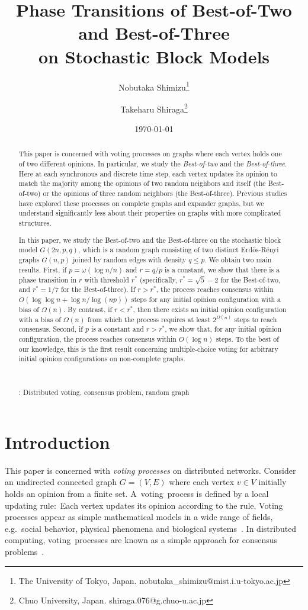 \documentclass[letterpaper,11pt]{article}
\title{Phase Transitions of Best-of-Two and Best-of-Three\\ on Stochastic Block Models}
\author{Nobutaka Shimizu\thanks{The University of Tokyo, Japan. {\ttfamily nobutaka\_shimizu@mist.i.u-tokyo.ac.jp}} \and Takeharu Shiraga\thanks{Chuo University, Japan. {\ttfamily shiraga.076@g.chuo-u.ac.jp}}}
\date{\today}
\begin{document}
\maketitle


\begin{abstract}
This paper is concerned with voting processes on graphs where each vertex holds one of two different opinions.
In particular, we study the \emph{Best-of-two} and the \emph{Best-of-three}.
Here at each synchronous and discrete time step, each vertex updates its opinion to match the majority among the opinions of two random neighbors and itself (the Best-of-two) or the  opinions of three random neighbors (the Best-of-three).
Previous studies have explored these processes on complete graphs and expander graphs, 
but we understand significantly less about their properties on graphs with more complicated structures.

In this paper, we study the Best-of-two and the Best-of-three on the stochastic block model $G(2n,p,q)$, which is a random graph consisting of two distinct Erd\H{o}s-R\'enyi graphs $G(n,p)$ joined by random edges with density $q\leq p$.
We obtain two main results.
First, if $p=\omega(\log n/n)$ and $r=q/p$ is a constant, we show that there is a phase transition in $r$ with threshold $r^*$ (specifically, $r^*=\sqrt{5}-2$ for the Best-of-two, and $r^*=1/7$ for the Best-of-three).
If $r>r^*$, the process reaches consensus within $O(\log \log n+\log n/\log (np))$ steps for any initial opinion configuration with a bias of $\Omega(n)$.
By contrast, if $r<r^*$, then there exists an initial opinion configuration with a bias of $\Omega(n)$ from which the process requires at least $2^{\Omega(n)}$ steps to reach consensus.
Second, if $p$ is a constant and  $r>r^*$, we show that, for any initial opinion configuration, the process reaches consensus within $O(\log n)$ steps.
To the best of our knowledge, this is the first result concerning multiple-choice voting for arbitrary initial opinion configurations on non-complete graphs.

\ 

: Distributed voting, consensus problem, random graph

\end{abstract}


\section{Introduction}
This paper is concerned with {\em voting processes} %
on distributed networks.
Consider an undirected connected graph $G=(V,E)$ where each vertex $v\in V$ initially holds an opinion from a finite set.
A~voting~process is defined by a local updating rule:~Each vertex updates its opinion according to the rule.
Voting processes appear as simple mathematical models in a wide range of fields, e.g.~social behavior, physical phenomena and biological systems~\cite{MNT14,Liggett85,AABHBB11}.
In distributed computing, voting~processes are known as a simple approach for consensus problems~\cite{FLM86,GK10}.
\end{document}
